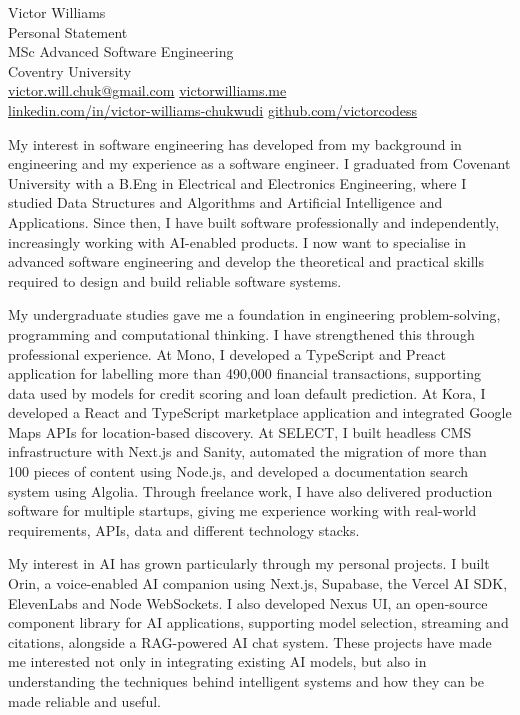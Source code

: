 \documentclass[11pt,a4paper]{article}
\begin{document}
\begin{center}
{\Large Victor Williams}\\[0.4em]
Personal Statement\\[0.15em]
MSc Advanced Software Engineering\\
Coventry University\\[0.4em]
{\small
\href{mailto:victor.will.chuk@gmail.com}{victor.will.chuk@gmail.com}
\quad
\href{https://www.victorwilliams.me/}{victorwilliams.me}\\[0.15em]
\href{https://www.linkedin.com/in/victor-williams-chukwudi/}{linkedin.com/in/victor-williams-chukwudi}
\quad
\href{https://github.com/victorcodess}{github.com/victorcodess}
}
\end{center}

\vspace{0.2em}

My interest in software engineering has developed from my background in engineering and my experience as a software engineer. I graduated from Covenant University with a B.Eng in Electrical and Electronics Engineering, where I studied Data Structures and Algorithms and Artificial Intelligence and Applications. Since then, I have built software professionally and independently, increasingly working with AI-enabled products. I now want to specialise in advanced software engineering and develop the theoretical and practical skills required to design and build reliable software systems.

My undergraduate studies gave me a foundation in engineering problem-solving, programming and computational thinking. I have strengthened this through professional experience. At Mono, I developed a TypeScript and Preact application for labelling more than 490,000 financial transactions, supporting data used by models for credit scoring and loan default prediction. At Kora, I developed a React and TypeScript marketplace application and integrated Google Maps APIs for location-based discovery. At SELECT, I built headless CMS infrastructure with Next.js and Sanity, automated the migration of more than 100 pieces of content using Node.js, and developed a documentation search system using Algolia. Through freelance work, I have also delivered production software for multiple startups, giving me experience working with real-world requirements, APIs, data and different technology stacks.

My interest in AI has grown particularly through my personal projects. I built Orin, a voice-enabled AI companion using Next.js, Supabase, the Vercel AI SDK, ElevenLabs and Node WebSockets. I also developed Nexus UI, an open-source component library for AI applications, supporting model selection, streaming and citations, alongside a RAG-powered AI chat system. These projects have made me interested not only in integrating existing AI models, but also in understanding the techniques behind intelligent systems and how they can be made reliable and useful.
\end{document}
